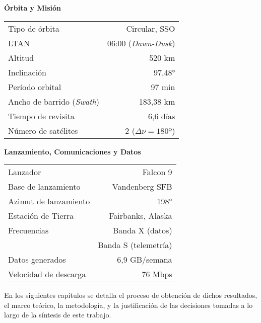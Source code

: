 \begin{table}[!htbp]
\vspace{2em}

\begin{minipage}[t]{0.495\textwidth}
\raggedright
\textbf{Órbita y Misión}
\vspace{0.3em}
\small
\begin{tabular}{@{} l r @{}}
\toprule
Tipo de órbita           & Circular, SSO \\
LTAN                     & 06:00 (\textit{Dawn-Dusk}) \\
Altitud                  & 520 km  \\
Inclinación              & 97,48° \\
Período orbital          & 97 min  \\
Ancho de barrido (\textit{Swath}) & 183,38 km \\
Tiempo de revisita       & 6,6 días \\
Número de satélites      & 2 ($\Delta \nu = 180º$)\\
\bottomrule
\end{tabular}
\end{minipage}%
\begin{minipage}[t]{0.495\textwidth}
\raggedleft
\textbf{Lanzamiento, Comunicaciones y Datos}
\vspace{0.3em}
\small
\begin{tabular}{@{} l r @{}}
\toprule
Lanzador                 & Falcon 9 \\
Base de lanzamiento      & Vandenberg SFB \\
Azimut de lanzamiento    & 198° \\
Estación de Tierra       & Fairbanks, Alaska \\
Frecuencias              & Banda X (datos) \\
                         & Banda S (telemetría) \\
Datos generados          & 6,9 GB/semana \\
Velocidad de descarga    & 76 Mbps \\
\bottomrule
\end{tabular}
\end{minipage}
\end{table}


\hfill \break

En los siguientes capítulos se detalla el proceso de obtención de dichos resultados, el marco teórico, la metodología, y la justificación de las decisiones tomadas a lo largo de la síntesis de este trabajo.